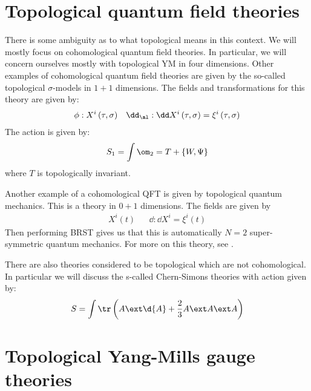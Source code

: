 \documentclass{booc}
\begin{document}
\section{Topological quantum field theories}

There is some ambiguity as to what topological means in this context.
We will mostly focus on cohomological quantum field theories. In particular, 
we will concern ourselves mostly with topological YM in four dimensions.
Other examples of cohomological quantum field theories are given by the so-called
topological $\sigma$-models in $1+1$ dimensions.
The fields and transformations for this theory are given by:
\begin{align}
\phi: X^i\left( \tau , \sigma \right) &&
\dd_\al: \dd X^i \left( \tau , \sigma \right) = \xi^i\left( \tau , \sigma \right)
\end{align}
The action is given by:
\begin{equation}
S_1 = \int \om_2 = T + \left\{ W , \Psi \right\}
\end{equation}
where $T$ is topologically invariant.

Another example of a cohomological QFT is given by topological quantum mechanics. 
This is a theory in $0+1$ dimensions.
The fields are given by
\begin{align}
X^i\left( t \right)
&& \dd: \dd X^i = \xi^i\left( t \right)
\end{align}
Then performing BRST gives us that this is automatically $N = 2$ super-symmetric quantum mechanics.
For more on this theory, see \cite{baulieu}.

There are also theories considered to be topological which are not cohomological.
In particular we will discuss the s-called Chern-Simons theories with action given by:
\begin{equation}
S = \int \tr \left( A \ext \d{A} + \frac{2}{3} 
A\ext A \ext A\right)
\end{equation}

\section{Topological Yang-Mills gauge theories}
\end{document}
